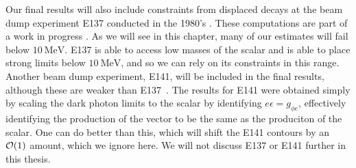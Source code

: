 Our final results will also include constraints from displaced decays at the beam dump experiment E137 conducted in the 1980's \cite{Bjorken:1988as}.
These computations are part of a work in progress \cite{Batell:2015unpub}.
As we will see in this chapter, many of our estimates will fail below $10~\textrm{MeV}$.
E137 is able to access low masses of the scalar and is able to place strong limits below $10~\textrm{MeV}$, and so we can rely on its constraints in this range.
Another beam dump experiment, E141, will be included in the final results, although these are weaker than E137~\cite{Bjorken:2009mm}.
The results for E141 were obtained simply by scaling the dark photon limits to the scalar by identifying $e \epsilon = g_{\phi e}$, effectively identifying the production of the vector to be the same as the produciton of the scalar.
One can do better than this, which will shift the E141 contours by an $\operatorname{\mathcal{O}}(1)$ amount, which we ignore here.
We will not discuss E137 or E141 further in this thesis.




